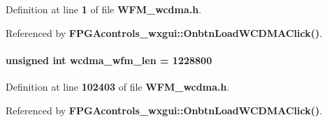 Definition at line {\bf 1} of file {\bf W\+F\+M\+\_\+wcdma.\+h}.



Referenced by {\bf F\+P\+G\+Acontrols\+\_\+wxgui\+::\+Onbtn\+Load\+W\+C\+D\+M\+A\+Click()}.

\paragraph[{wcdma\+\_\+wfm\+\_\+len}]{\setlength{\rightskip}{0pt plus 5cm}unsigned {\bf int} wcdma\+\_\+wfm\+\_\+len = 1228800}\label{WFM__wcdma_8h_a2708a45bfde9bfd5c791413d01b0b9c6}


Definition at line {\bf 102403} of file {\bf W\+F\+M\+\_\+wcdma.\+h}.



Referenced by {\bf F\+P\+G\+Acontrols\+\_\+wxgui\+::\+Onbtn\+Load\+W\+C\+D\+M\+A\+Click()}.

